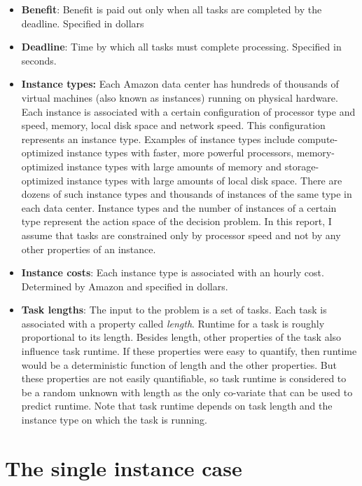 \documentclass[12pt]{report}
\begin{document}
\begin{itemize}

\item \textbf{Benefit}: Benefit is paid out only when all tasks are completed by the deadline. Specified in dollars
\item \textbf{Deadline}: Time by which all tasks must complete processing. Specified in seconds.

\item \textbf{Instance types:}
Each Amazon data center has hundreds of thousands of virtual machines  (also known as instances) \cite{AWS:EC2} running on physical hardware.
Each instance is associated with a certain configuration of processor type and speed, memory, local disk space and network speed.
This configuration represents an instance type.
Examples of instance types include compute-optimized instance types with faster, more powerful processors, memory-optimized instance types with large amounts of memory and storage-optimized instance types with large amounts of local disk space.
There are dozens of such instance types and thousands of instances of the same type in each data center.
Instance types and the number of instances of a certain type represent the action space of the decision problem.
In this report, I assume that tasks are constrained only by processor speed and not by any other properties of an instance.

\item \textbf{Instance costs}: Each instance type is associated with an hourly cost. Determined by Amazon and specified in dollars. 

\item \textbf{Task lengths}:
The input to the problem is a set of tasks.
Each task is associated with a property called \textit{length}.
Runtime for a task is roughly proportional to its length.
Besides length, other properties of the task also influence task runtime.
If these properties were easy to quantify, then runtime would be a deterministic function of length and the other properties.
But these properties are not easily quantifiable, so task runtime is considered to be a random unknown with length as the only co-variate that can be used to predict runtime.
Note that task runtime depends on task length and the instance type on which the task is running.

\end{itemize}

\chapter{The single instance case}
\end{document}
